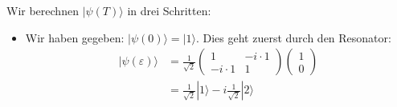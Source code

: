 \documentclass[11pt, ngerman, fleqn, DIV=15, headinclude]{scrartcl}
\begin{document}
	Wir berechnen $|\psi(T)\rangle$ in drei Schritten:
	\begin{itemize}
	\item Wir haben gegeben: $|\psi(0)\rangle=|1\rangle$. Dies geht zuerst durch den Resonator:
		\begin{align*}
			|\psi(\varepsilon)\rangle&=\frac{1}{\sqrt{2}} \begin{pmatrix}1 &-i\cdot 1 \\ -i\cdot 1 & 1 \end{pmatrix} \begin{pmatrix} 1 \\ 0 \end{pmatrix} \\
					&= \frac{1}{\sqrt{2}} |1\rangle -i\frac{1}{\sqrt{2}}   |2\rangle \\
		\end{align*}	
	

\end{itemize}
\end{document}
